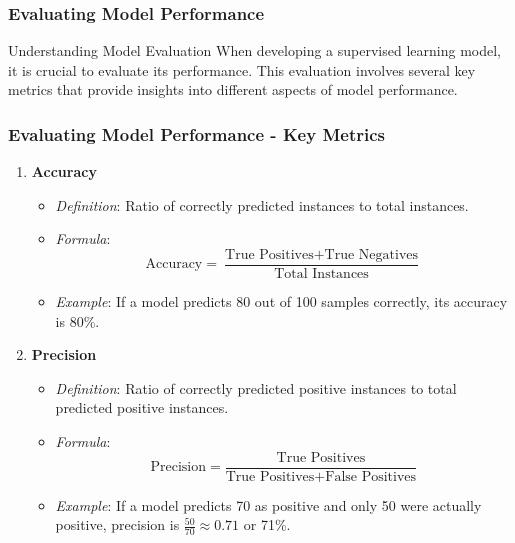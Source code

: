 \documentclass[aspectratio=169]{beamer}
\begin{document}
\begin{frame}[fragile]
    \frametitle{Evaluating Model Performance}
    \begin{block}{Understanding Model Evaluation}
        When developing a supervised learning model, it is crucial to evaluate its performance. This evaluation involves several key metrics that provide insights into different aspects of model performance.
    \end{block}
\end{frame}

\begin{frame}[fragile]
    \frametitle{Evaluating Model Performance - Key Metrics}
    \begin{enumerate}
        \item \textbf{Accuracy}
            \begin{itemize}
                \item \textit{Definition}: Ratio of correctly predicted instances to total instances. 
                \item \textit{Formula}:
                \begin{equation}
                    \text{Accuracy} = \frac{\text{True Positives} + \text{True Negatives}}{\text{Total Instances}}
                \end{equation}
                \item \textit{Example}: If a model predicts 80 out of 100 samples correctly, its accuracy is 80\%.
            \end{itemize}

        \item \textbf{Precision}
            \begin{itemize}
                \item \textit{Definition}: Ratio of correctly predicted positive instances to total predicted positive instances.
                \item \textit{Formula}:
                \begin{equation}
                    \text{Precision} = \frac{\text{True Positives}}{\text{True Positives} + \text{False Positives}}
                \end{equation}
                \item \textit{Example}: If a model predicts 70 as positive and only 50 were actually positive, precision is \( \frac{50}{70} \approx 0.71 \) or 71\%.
            \end{itemize}
    \end{enumerate}
\end{frame}
\end{document}

